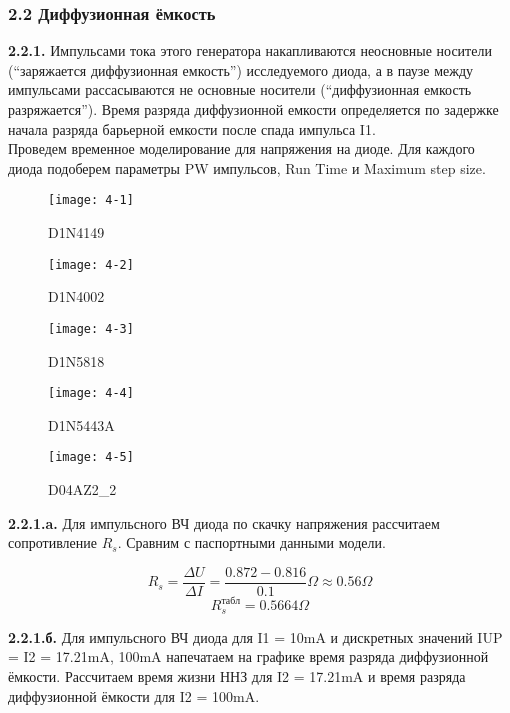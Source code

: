 \documentclass{semi}
\begin{document}
\subsubsection*{2.2 Диффузионная ёмкость}

\textbf{{\normalsize 2.2.1.}}
Импульсами тока этого генератора накапливаются неосновные носители (“заряжается диффузионная емкость”) исследуемого диода, а в паузе между импульсами рассасываются не основные носители (“диффузионная емкость разряжается”). Время разряда диффузионной емкости определяется по задержке начала разряда барьерной емкости после спада импульса I1.\\
Проведем временное моделирование для напряжения на диоде. Для каждого диода
подоберем параметры PW импульсов, Run Time и Maximum step size.\\

\begin{figure}[H]
	\centering
	\texttt{[image: 4-1]}
	\caption{D1N4149}
\end{figure}

\begin{figure}[H]
	\centering
	\texttt{[image: 4-2]}
	\caption{D1N4002}
\end{figure}

\begin{figure}[H]
	\centering
	\texttt{[image: 4-3]}
	\caption{D1N5818}
\end{figure}

\begin{figure}[H]
	\centering
	\texttt{[image: 4-4]}
	\caption{D1N5443A}
\end{figure}

\begin{figure}[H]
	\centering
	\texttt{[image: 4-5]}
	\caption{D04AZ2\_2}
\end{figure}


\textbf{{\normalsize 2.2.1.a.}}
Для импульсного ВЧ диода по скачку напряжения рассчитаем сопротивление $R_s$. Сравним с паспортными данными модели.\\

\begin{center}
	\[R_s=\dfrac{\Delta U}{\Delta I} = \dfrac{0.872-0.816}{0.1} \Omega \approx 0.56 \Omega \]
	\[R_s^{табл} = 0.5664 \Omega \]
\end{center}
\textbf{{\normalsize 2.2.1.б.}}
Для импульсного ВЧ диода для I1 = 10mA и дискретных значений IUP = I2 = 17.21mA, 100mA напечатаем на графике время разряда диффузионной ёмкости. Рассчитаем время жизни ННЗ для I2 = 17.21mA и время разряда диффузионной ёмкости для I2 = 100mA.\\
\end{document}
